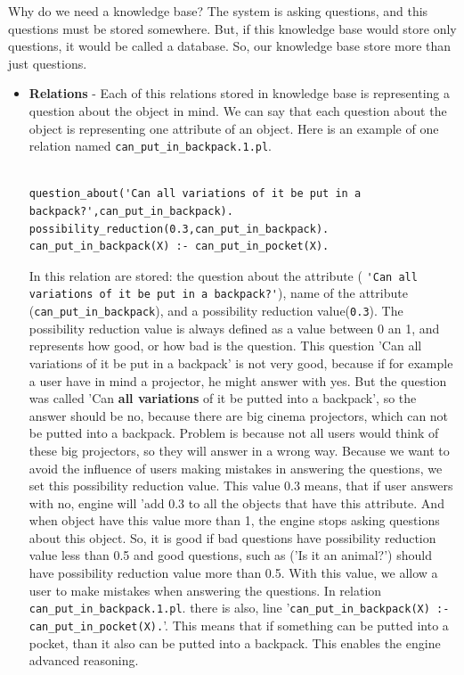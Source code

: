 \documentclass[a4paper]{article}
\begin{document}
Why do we need a knowledge base? The system is asking questions, and this questions must be stored somewhere. But, if this knowledge base would store only questions, it would be called a database. So, our knowledge base store more than just questions.

\begin{itemize}
\item  \textbf{Relations} - Each of this relations stored in knowledge base is representing a question about the object in mind. We can say that each question about the object is representing one attribute of an object. Here is an example of one relation named \verb|can_put_in_backpack.1.pl|.

\begin{lstlisting}[caption=Relation can\_put\_in\_backpack.1.pl,label=lst:relationexample]

question_about('Can all variations of it be put in a backpack?',can_put_in_backpack).
possibility_reduction(0.3,can_put_in_backpack).
can_put_in_backpack(X) :- can_put_in_pocket(X).
\end{lstlisting}

In this relation are stored: the question about the attribute ( \verb|'Can all variations of it be put in a backpack?'|), name of the attribute (\verb|can_put_in_backpack|), and a possibility reduction value(\verb|0.3|). The possibility reduction value is always defined as a value between 0 an 1, and represents how good, or how bad is the question. This question 'Can all variations of it be put in a backpack' is not very good, because if for example a user have in mind a projector, he might answer with yes. But the question was called 'Can \textbf{all variations} of it be putted into a backpack', so the answer should be no, because there are big cinema projectors, which can not be putted into a backpack. Problem is because not all users would think of these big projectors, so they will answer in a wrong way. Because we want to avoid the influence of users making mistakes in answering the questions, we set this possibility reduction value. This value 0.3 means, that if user answers with no, engine will 'add 0.3 to all the objects that have this attribute. And when object have this value more than 1, the engine stops asking questions about this object. So, it is good if bad questions have possibility reduction value less than 0.5 and good questions, such as ('Is it an animal?') should have possibility reduction value more than 0.5. With this value, we allow a user to make mistakes when answering the questions.
In relation \verb|can_put_in_backpack.1.pl|. there is also, line '\verb|can_put_in_backpack(X) :- can_put_in_pocket(X).|'. This means that if something can be putted into a pocket, than it also can be putted into a backpack. This enables the engine advanced reasoning. 



\end{itemize}
\end{document}
